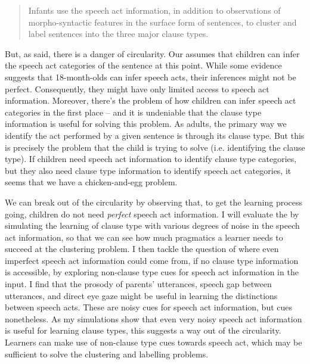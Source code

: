 \begin{quote}
Infants use the speech act information, in addition to observations of morpho-syntactic features in the surface form of sentences, to cluster and label sentences into the three major clause types.
\end{quote}



But, as said, there is a danger of circularity.
Our \hypos{} assumes that children can infer the speech act categories of the sentence at this point. While some evidence suggests that 18-month-olds can infer speech acts, their inferences might not be perfect. Consequently, they might have only limited access to speech act information. Moreover, there's the problem of how children can infer speech act categories in the first place -- and it is undeniable that the clause type information is useful for solving this problem. As adults, the primary way we identify the act performed by a given sentence is through its clause type. But this is precisely the problem that the child is trying to solve (i.e. identifying the clause type). If children need speech act information to identify clause type categories, but they also need clause type information to identify speech act categories, it seems that we have a chicken-and-egg problem. 

We can break out of the circularity by observing that, to get the learning process going, children do not need \emph{perfect} speech act information. I will evaluate the \hypos{} by 
simulating the learning of clause type with various degrees of noise in the speech act information, so that we can see how much pragmatics a learner needs to succeed at the clustering problem. I then tackle the question of where even imperfect speech act information could come from, if no clause type information is accessible,
by exploring non-clause type cues for speech act information in the input. I find that the prosody of parents' utterances, speech gap between utterances, and direct eye gaze might be useful in learning the distinctions between speech acts.
These are noisy cues for speech act information, but cues nonetheless. As my simulations show that even very noisy speech act information is useful for learning clause types, this suggests a way out of the circularity. Learners can make use of non-clause type cues towards speech act, which may be sufficient to solve the clustering and labelling problems.

